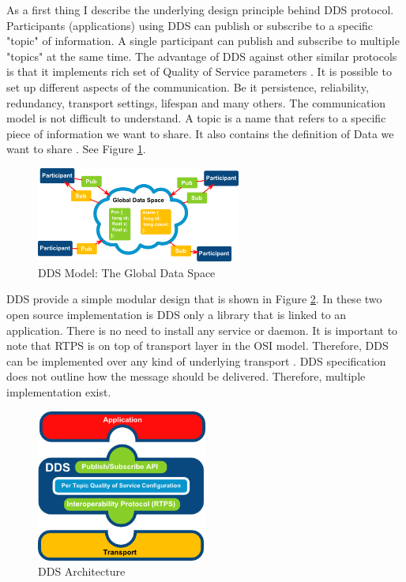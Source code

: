 \documentclass{csfourzero}
\begin{document}
\quad As a first thing I describe the underlying design principle behind DDS protocol. Participants (applications) using DDS can publish or subscribe to a specific "topic" of information. A single participant can publish and subscribe to multiple "topics" at the same time. The advantage of DDS against other similar protocols is that it implements rich set of Quality of Service parameters \cite{what-is-dds}. It is possible to set up different aspects of the communication. Be it persistence, reliability, redundancy, transport settings, lifespan and many others. The communication model is not difficult to understand. A topic is a name that refers to a specific piece of information we want to share. It also contains the definition of Data we want to share \cite{eprosima-dds}. See Figure \ref{fig:GlobalDataSpace}.

\begin{figure}[h]
	\centering
	\includegraphics[width=0.6\textwidth]{GlobalDataSpace}
	\caption{\label{fig:GlobalDataSpace}DDS Model: The Global Data Space \cite{eprosima-dds}}
\end{figure}

DDS provide a simple modular design that is shown in Figure \ref{fig:DDSArch}. In these two open source implementation is DDS only a library that is linked to an application. There is no need to install any service or daemon. It is important to note that RTPS is on top of transport layer in the OSI model. Therefore, DDS can be implemented over any kind of underlying transport \cite{eprosima-dds}. DDS specification does not outline how the message should be delivered. Therefore, multiple implementation exist.

\begin{figure}[h]
	\centering
	\includegraphics[width=0.5\textwidth]{DDSArch}
	\caption{\label{fig:DDSArch}DDS Architecture \cite{eprosima-dds}}
\end{figure}
\end{document}
